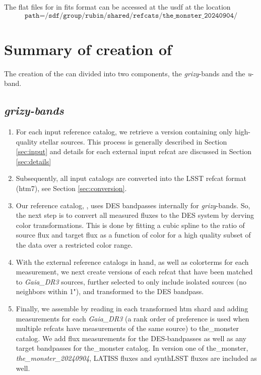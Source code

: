The flat files for \monster in fits format can be accessed at the usdf at the location
$$\texttt{path=/sdf/group/rubin/shared/refcats/the\_monster\_20240904/}$$


\section{Summary of creation of \monster}
\label{sec:summary}
The creation of the \monster can divided into two components, the \textit{grizy}-bands and the \textit{u}-band. 


\subsection{\textit{grizy-bands}}
\begin{enumerate}
    \item For each input reference catalog, we retrieve a version containing only high-quality stellar sources. This process is generally described in Section \ref{sec:input} and details for each external input refcat are discussed in Section \ref{sec:details}
    \item Subsequently, all input catalogs are converted into the LSST refcat format (htm7), see Section \ref{sec:conversion}.
    \item Our reference catalog, \monster, uses DES bandpasses internally for \textit{grizy}-bands. So, the next step is to convert all measured fluxes to the DES system by derving color transformations. 
    This is done by fitting a cubic spline to the ratio of source flux and target flux as a function of color for a high quality subset of the data over a restricted color range.
    \item With the external reference catalogs in hand, as well as colorterms for each measurement, we next create versions of each refcat that have been matched to \textit{Gaia\_DR3} sources, further selected to only include isolated sources (no neighbors within 1"), and transformed to the DES bandpass.
    \item Finally, we assemble \monster by reading in each transformed htm shard and adding measurements for each \textit{Gaia\_DR3} (a rank order of preference is used when multiple refcats have measurements of the same source) to the\_monster catalog. We add flux measurements for the DES-bandpasses as well as any target bandpasses for the\_monster catalog. In version one of the\_monster, \textit{the\_monster\_20240904}, LATISS fluxes and synthLSST fluxes are included as well.
\end{enumerate}

